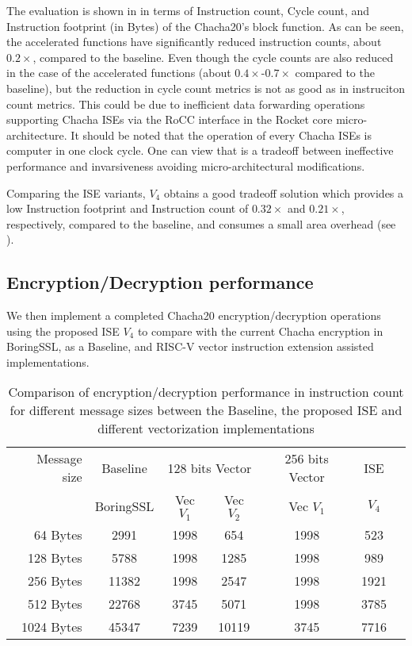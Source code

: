 The evaluation is shown in  in terms of Instruction count, Cycle count, and Instruction footprint (in Bytes) of the Chacha20's block function. As can be seen, the accelerated functions have significantly reduced instruction counts, about $0.2\times$, compared to the baseline. Even though the cycle counts are also reduced in the case of the accelerated functions (about $0.4\times$-$0.7\times$ compared to the baseline), but the reduction in cycle count metrics is not as good as in instruciton count metrics. This could be due to inefficient data forwarding operations supporting Chacha ISEs via the RoCC interface in the Rocket core micro-architecture. It should be noted that the operation of every Chacha ISEs is computer in one clock cycle. One can view that is a tradeoff between ineffective performance and invarsiveness avoiding micro-architectural modifications.

Comparing the ISE variants, $V_4$ obtains a good tradeoff solution which provides a low Instruction footprint and Instruction count of $0.32\times$ and $0.21\times$, respectively, compared to the baseline, and consumes a small area overhead (see ).

\subsection{Encryption/Decryption performance}
We then implement a completed Chacha20 encryption/decryption operations using the proposed ISE $V_4$ to compare with the current Chacha encryption in BoringSSL, as a Baseline, and RISC-V vector instruction extension assisted implementations.

\begin{table}
\caption{Comparison of encryption/decryption performance in instruction count for different message sizes between the Baseline, the proposed ISE and different vectorization implementations}
\label{tab:res:sw:perf2}
\begin{tabular}{rcccccc}
\toprule             
Message size & Baseline  & \multicolumn{2}{c}{128 bits Vector} & 256 bits Vector  &   ISE       \\
             & BoringSSL & Vec $V_1$   &   Vec $V_2$    & Vec $V_1$ &   $V_4$ \\
\midrule
  64 Bytes   &    2991   &    1998     &       654      &    1998   &   523       \\
 128 Bytes   &    5788   &    1998     &      1285      &    1998   &   989       \\
 256 Bytes   &   11382   &    1998     &      2547      &    1998   &  1921       \\
 512 Bytes   &   22768   &    3745     &      5071      &    1998   &  3785       \\
1024 Bytes   &   45347   &    7239     &     10119      &    3745   &  7716       \\
\bottomrule
\end{tabular}
\end{table}

